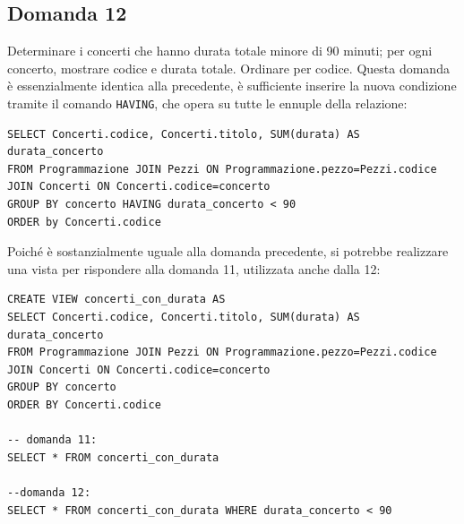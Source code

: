 \documentclass{article}
\numberwithin{equation}{subsection}
\begin{document}
\subsection{Domanda 12}
Determinare i concerti che hanno durata totale minore di 90 minuti; per ogni concerto, mostrare codice e durata totale. Ordinare per codice. Questa domanda è essenzialmente identica alla precedente, è 
sufficiente inserire la nuova condizione tramite il comando \verb|HAVING|, che opera su tutte le ennuple della relazione: 
\begin{verbatim}
SELECT Concerti.codice, Concerti.titolo, SUM(durata) AS durata_concerto
FROM Programmazione JOIN Pezzi ON Programmazione.pezzo=Pezzi.codice
JOIN Concerti ON Concerti.codice=concerto
GROUP BY concerto HAVING durata_concerto < 90
ORDER by Concerti.codice
\end{verbatim}
Poiché è sostanzialmente uguale alla domanda precedente, si potrebbe realizzare una vista per rispondere alla domanda 11, utilizzata anche dalla 12:
\begin{verbatim}
CREATE VIEW concerti_con_durata AS
SELECT Concerti.codice, Concerti.titolo, SUM(durata) AS durata_concerto
FROM Programmazione JOIN Pezzi ON Programmazione.pezzo=Pezzi.codice
JOIN Concerti ON Concerti.codice=concerto
GROUP BY concerto
ORDER BY Concerti.codice

-- domanda 11:
SELECT * FROM concerti_con_durata

--domanda 12:
SELECT * FROM concerti_con_durata WHERE durata_concerto < 90
\end{verbatim}
\end{document}
